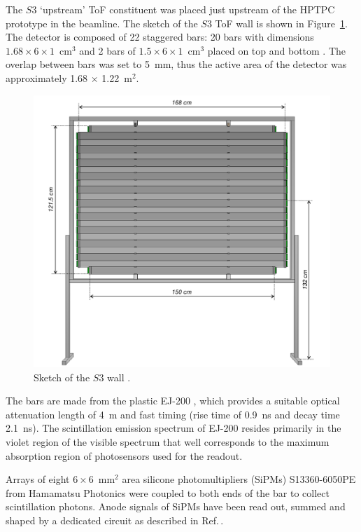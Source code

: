 The $S3$ `upstream' ToF constituent was placed just upstream of the HPTPC prototype in the beamline. The sketch of the $S3$ ToF wall is shown in Figure~\ref{fig:S3sketch}. The detector is composed of 22 staggered bars:  20 bars with dimensions $1.68 \times 6 \times 1$~cm$^3$ and 2 bars of  $1.5 \times 6 \times 1$~cm$^3$ placed on top and bottom \cite{S3-proceedings}.
The overlap between bars was set to 5~mm, thus the active area of the detector was approximately 1.68 $\times$ 1.22~m$^2$.
     \begin{figure}
      \centering
    \includegraphics[width=0.7\linewidth]{files/Figures/uToF_sketch.pdf}
    	\caption{Sketch of the $S3$ wall \cite{S3-proceedings}.}
    		\label{fig:S3sketch}
    \end{figure}
    
The bars are made from the plastic EJ-200 \cite{SCIONIX}, which 
provides a suitable optical attenuation length of 4~m and fast timing (rise time of 0.9~ns and decay time 2.1~ns). 
The scintillation emission spectrum of EJ-200 resides primarily in the violet region of the visible spectrum that well corresponds to the maximum absorption region of photosensors used for the readout.

Arrays of eight $6 \times 6$~mm$^2$ area silicone photomultipliers (SiPMs) S13360-6050PE from Hamamatsu Photonics \cite{Hamamatsu} were coupled to both ends of the bar to collect scintillation photons. Anode signals of SiPMs have been read out, summed and shaped by a dedicated circuit as described in Ref.\,\cite{S3-readout}.

